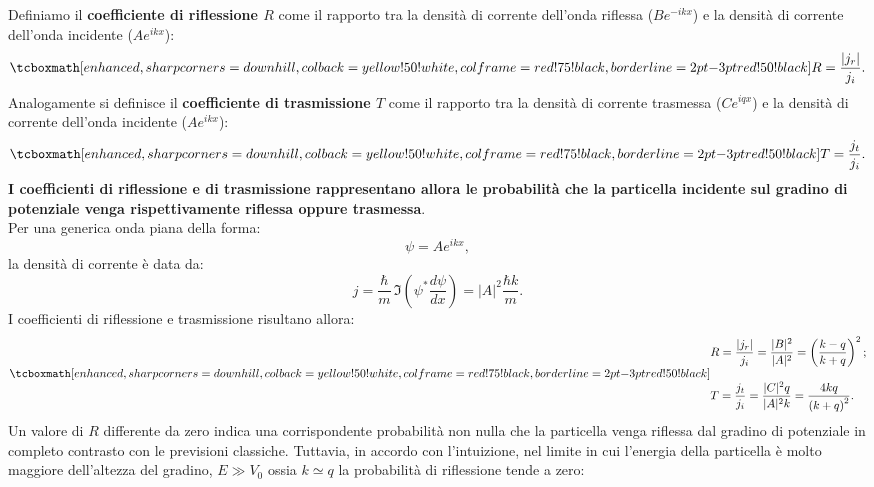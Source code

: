 \documentclass[a4paper,12pt,oneside]{book}
\begin{document}
Definiamo il \textbf{coefficiente di riflessione $R$} come il rapporto tra la densità di corrente dell'onda riflessa ($\displaystyle{Be^{-ikx}}$) e la densità di corrente dell'onda incidente ($\displaystyle{Ae^{ikx}}$):
	\begin{equation}
		\tcboxmath[enhanced, sharp corners=downhill, colback=yellow!50!white, colframe=red!75!black, borderline={2pt}{-3pt}{red!50!black}]{
			R=\frac{|j_r|}{j_i}.
			}
	\end{equation}
Analogamente si definisce il \textbf{coefficiente di trasmissione $T$} come il rapporto tra la densità di corrente trasmessa ($\displaystyle{Ce^{iqx}}$) e la densità di corrente dell'onda incidente ($\displaystyle{Ae^{ikx}}$):
	\begin{equation}
		\tcboxmath[enhanced, sharp corners=downhill, colback=yellow!50!white, colframe=red!75!black, borderline={2pt}{-3pt}{red!50!black}]{
			T=\frac{j_t}{j_i}.
			}
	\end{equation}
\textbf{I coefficienti di riflessione e di trasmissione rappresentano allora le probabilità che la particella incidente sul gradino di potenziale venga rispettivamente riflessa oppure trasmessa}.\\
Per una generica onda piana della forma:
	\begin{equation}
		\psi= Ae^{ikx},
	\end{equation}
la densità di corrente è data da:
	\begin{equation}
		j=\frac{\hbar}{m}\, \Im \left(\psi ^* \frac{d\psi}{dx} \right)= |A|^2\frac{\hbar k}{m}.
	\end{equation}
I coefficienti di riflessione e trasmissione risultano allora:
	\begin{equation}
		\tcboxmath[enhanced, sharp corners=downhill, colback=yellow!50!white, colframe=red!75!black, borderline={2pt}{-3pt}{red!50!black}]{
			\begin{aligned}
			& R=\frac{|j_r|}{j_i}= \frac{|B|^2}{|A|^2}=\left(\frac{k-q}{k+q}\right)^2; \\[0.3cm]
			& T=\frac{j_t}{j_i}= \frac{|C|^2 q}{|A|^2 k}=\frac{4kq}{\left(k+q\right)^2}. 
			\end{aligned}
			}
	\end{equation}
Un valore di $R$ differente da zero indica una corrispondente probabilità non nulla che la particella venga riflessa dal gradino di potenziale in completo contrasto con le previsioni classiche. Tuttavia, in accordo con l'intuizione, nel limite in cui l'energia della particella è molto maggiore dell'altezza del gradino, $E\gg V_0$ ossia $k\simeq q$ la probabilità di riflessione tende a zero:
\end{document}
